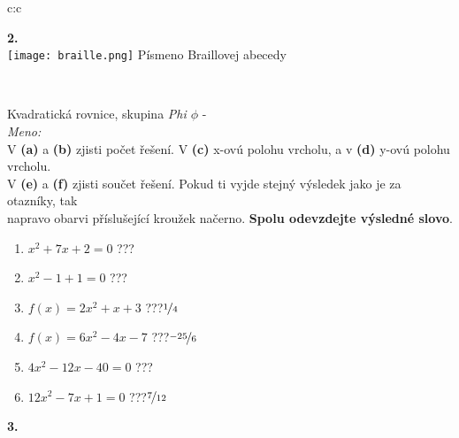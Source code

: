 \documentclass[10pt]{report}
\begin{document}
\begin{tabular}{c:c}
\begin{minipage}[c][99mm][t]{0.49\linewidth}
\begin{center}
\begin{minipage}{0.20\linewidth}
\begin{center}
{\Huge\bfseries 2.} \\[2mm]
\texttt{[image: braille.png]}
{\small Písmeno Braillovej abecedy}
\end{center}
\end{minipage}
\end{center}
\end{minipage}
\\ \hdashline
\begin{minipage}[c][99mm][t]{0.49\linewidth}
\begin{center}
\vspace{7mm}
{\huge Kvadratická rovnice, skupina \textit{Phi $\phi$} -}\\[4.5mm]
\textit{Meno:}\phantom{xxxxxxxxxxxxxxxxxxxxxxxxxxxxxxxxxxxxxxxxxxxxxxxxxxxxxxxxxxxxxxxxx}\\[3.5mm]
V \textbf{(a)} a \textbf{(b)} zjisti počet řešení. V \textbf{(c)} x-ovú polohu vrcholu, a v \textbf{(d)} y-ovú polohu vrcholu.\\V \textbf{(e)} a \textbf{(f)} zjisti součet řešení. Pokud ti vyjde stejný výsledek jako je za otazníky, tak\\napravo obarvi příslušející kroužek načerno. \textbf{Spolu odevzdejte výsledné slovo}.\\[3mm]
\begin{minipage}{0.77\linewidth}
\begin{center}
\begin{varwidth}{\textwidth}
\begin{enumerate}
\large
\item $x^2+7x+2=0$\quad \dotfill\; ???\;\dotfill {}
\item $x^2-1+1=0$\quad \dotfill\; ???\;\dotfill {}
\item $f(x)=2x^2+x+3$\quad \dotfill\; ???\;\dotfill \quad $\nicefrac{1}{4}$
\item $f(x)=6x^2-4x-7$\quad \dotfill\; ???\;\dotfill \quad $\nicefrac{-25}{6}$
\item $4x^2-12x-40=0$\quad \dotfill\; ???\;\dotfill {}
\item $12x^2-7x+1=0$\quad \dotfill\; ???\;\dotfill \quad $\nicefrac{7}{12}$
\end{enumerate}
\end{varwidth}
\end{center}
\end{minipage}
\begin{minipage}{0.20\linewidth}
\begin{center}
{\Huge\bfseries 3.} \\[2mm]

\end{center}
\end{minipage}
\end{center}
\end{minipage}
\end{tabular}
\end{document}
